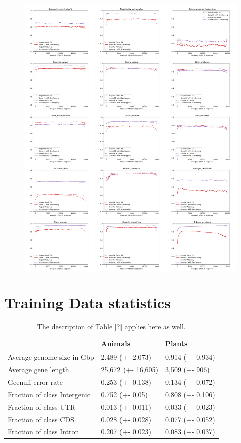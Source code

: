 \documentclass{article}
\begin{document}
\begin{figure}[!h]
\centerline{\includegraphics[width=1.2\textwidth]{images/overlapping/montage_plants4}}
\end{figure}

\clearpage
\section{Training Data statistics}
\label{sec:training_data}
\begin{table}[!h]
\renewcommand\thetable{S1}
\centering
\begin{tabular}{@{}lll@{}}
\hline
& Animals & Plants\\ [0.5ex]
\hline
Average genome size in Gbp& 2.489 (+- 2.073) & 0.914 (+- 0.934) \\
Average gene length & 25,672 (+- 16,605) & 3,509 (+- 906)\\
Geenuff error rate & 0.253 (+- 0.138) & 0.134 (+- 0.072) \\
Fraction of class Intergenic & 0.752 (+- 0.05) & 0.808 (+- 0.106) \\
Fraction of class UTR & 0.013 (+- 0.011) & 0.033 (+- 0.023) \\
Fraction of class CDS & 0.028 (+- 0.028) & 0.077 (+- 0.052) \\
Fraction of class Intron  & 0.207 (+- 0.023) & 0.083 (+- 0.037) \\
\hline
\end{tabular}
\caption{The description of Table [?] applies here as well.}
\end{table}
\end{document}
